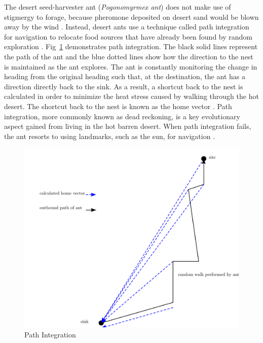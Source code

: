 The desert seed-harvester ant (\textit{Pogonomyrmex ant}) does not make use of stigmergy to forage, because pheromone deposited on desert sand would be blown away by the wind \cite{collett1992visual,hecker2015beyond}. Instead, desert ants use a technique called path integration for navigation to relocate food sources that have already been found by random exploration \cite{collett1998local,wehner2003desert}. Fig~\ref{pathintegration} demonstrates path integration. The black solid lines represent the path of the ant and the blue dotted lines show how the direction to the nest is maintained as the ant explores. The ant is constantly monitoring the change in heading from the original heading such that, at the destination, the ant has a direction directly back to the sink. As a result, a shortcut back to the nest is calculated in order to minimize the heat stress caused by walking through the hot desert. The shortcut back to the nest is known as the home vector \cite{muller1988path}. Path integration, more commonly known as dead reckoning, is a key evolutionary aspect gained from living in the hot barren desert. When path integration fails, the ant resorts to using landmarks, such as the sun, for navigation \cite{collett1998local}.

\begin{figure} [h]
	\centering
	\includegraphics[width=\textwidth]{chapters/chapter2/figures/drawing.png}
	\caption{Path Integration}
	\label{pathintegration}
\end{figure}

